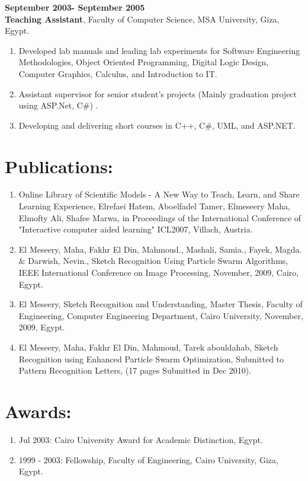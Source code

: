 \documentclass{article}
\begin{document}
 \textbf{September 2003- September 2005}\\
 \textbf{Teaching Assistant}, Faculty of Computer Science, MSA University, Giza, Egypt.
 \begin{enumerate}
\item Developed lab manuals and leading lab experiments for Software Engineering
Methodologies, Object Oriented Programming, Digital Logic Design, Computer Graphics, Calculus, and Introduction to IT.
 \item Assistant supervisor for senior student's projects (Mainly graduation project using ASP.Net, C\#) .
 \item Developing and delivering short courses in C++, C\#, UML, and ASP.NET.
\end{enumerate}

 \section*{Publications:}
 \begin{enumerate}
  \item Online Library of Scientific Models - A New Way to Teach, Learn, and
Share Learning Experience, Elrefaei Hatem, Aboelfadel Tamer, Elmeseery Maha,
Elmofty Ali, Shafee Marwa, in Proceedings of the International Conference of "Interactive computer aided learning" ICL2007, Villach, Austria.\textbf{\underbar{}}
  \item El Meseery, Maha, Fakhr El Din, Mahmoud., Mashali, Samia., Fayek, Magda.
 \& Darwish, Nevin., Sketch Recognition Using Particle Swarm Algorithms,  IEEE
 International Conference on Image Processing, November,  2009, Cairo, Egypt.
  \item El Meseery, Sketch Recognition and Understanding,  Master Thesis,
  Faculty of Engineering, Computer Engineering Department, Cairo
  University, November, 2009, Egypt.
  \item El Meseery, Maha, Fakhr El Din, Mahmoud, Tarek abouldahab, Sketch
  Recognition using Enhanced Particle Swarm Optimization, Submitted to Pattern
  Recognition Letters, (17 pages Submitted in Dec 2010).
\end{enumerate}
 \section*{Awards:}
  \begin{enumerate}
    \item Jul 2003: Cairo University Award for Academic Distinction, Egypt.
	\item 1999 - 2003: Fellowship, Faculty of Engineering, Cairo University, Giza,
	Egypt.
  \end{enumerate}
\end{document}
